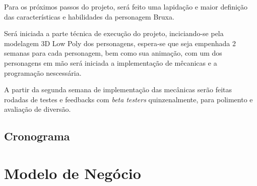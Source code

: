 Para os próximos passos do projeto, será feito uma lapidação e maior definição das características e habilidades da personagem Bruxa.

Será iniciada a parte técnica de execução do projeto, inciciando-se pela modelagem 3D Low Poly dos personagens, espera-se que seja empenhada 2 semanas para cada personagem, bem como sua animação, com um dos personagens em mão será iniciada a implementação de mêcanicas e a programação nescessária.

A partir da segunda semana de implementação das mecânicas serão feitas rodadas de testes e feedbacks com \textit{beta testers} quinzenalmente, para polimento e avaliação de diversão.


\section{Cronograma}


\chapter{Modelo de Negócio}



